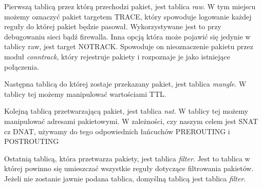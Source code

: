 \documentclass[a4paper,10pt,twoside]{book}
\begin{document}
				Pierwszą tablicą przez którą przechodzi pakiet, jest tablica \textit{raw}. W tym miejscu możemy oznaczyć pakiet targetem TRACE, który spowoduje logowanie każdej reguły do której pakiet będzie pasował. Wykorzystywane jest to przy debugowaniu sieci bądź firewalla.
				Inna opcją która może pojawić się jedynie w tablicy raw, jest target NOTRACK. Spowoduje on nieoznaczenie pakietu przez moduł \textit{conntrack}, który rejestruje pakiety i rozpoznaje je jako istniejące połączenia.

				Następna tablicą do której zostaje przekazany pakiet, jest tablica \textit{mangle}.
				W tablicy tej możemy manipulować wartościami TTL.

				Kolejną tablicą przetwarzającą pakiet, jest tablica \textit{nat}.
				W tablicy tej możemy manipulować adresami pakietowymi.
				W zależności, czy naszym celem jest SNAT cz DNAT, używamy do tego odpowiednich łańcuchów PREROUTING i POSTROUTING

				Ostatnią tablicą, która przetwarza pakiety, jest tablica \textit{filter}. Jest to tablica w której powinno się umieszczać wszystkie reguły dotyczące filtrowania pakietów. 
				Jeżeli nie zostanie jawnie podana tablica, domyślną tablicą jest tablica \textit{filter}.
\end{document}
